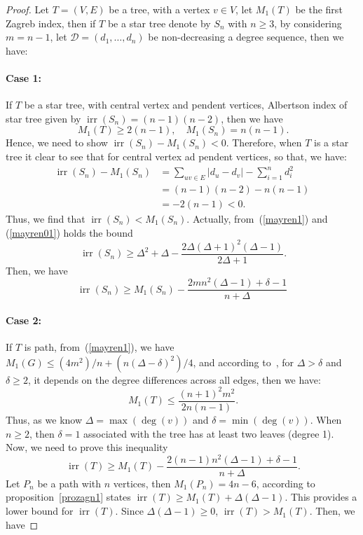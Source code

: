 \documentclass[12pt]{amsart}
\newcommand{\irr}{\operatorname{irr}}
\newcommand{\case}[1]{\paragraph*{Case #1:}}
\begin{document}
\begin{proof}
 Let $T=(V,E)$ be a tree, with a vertex $v\in V$, let $M_1(T)$ be the first Zagreb index, then if $T$ be a star tree denote by $S_n$ with $n\geq 3$, by considering $m=n-1$, let $\mathscr{D}=(d_1,\dots,d_n)$ be non-decreasing a degree sequence, then we have:
 \case{1} If $T$ be a star tree, with central vertex and pendent vertices,  Albertson index of star tree given by $\irr(S_n)=(n-1)(n-2)$, then we have 
 \begin{equation}~\label{mayren1}
  M_1(T)\geq 2(n-1), \quad M_1(S_n)=n(n-1).
 \end{equation}
 Hence, we need to show $\irr(S_n)- M_1(S_n)<0$. Therefore, when $T$ is a star tree it clear to see that for central vertex ad pendent vertices, so that, we have: 
 \begin{align*}
    \irr(S_n)- M_1(S_n)&=\sum_{uv\in E}\lvert d_u-d_v\rvert-\sum_{i=1}^{n}d_i^2\\
    &=(n-1)(n-2)-n(n-1)\\
    &=-2(n-1)<0.
 \end{align*}
Thus, we find that $\irr(S_n)<M_1(S_n)$. Actually, from~(\ref{mayren1}) and (\ref{mayren01}) holds the bound 
\begin{equation}~\label{eqqstarbound01}
    \irr(S_n) \geq \Delta^2 + \Delta - \frac{2 \Delta (\Delta + 1)^2 (\Delta - 1)}{2\Delta + 1}.
\end{equation}
Then, we have
\begin{equation}
    \irr(S_n) \geq M_1(S_n)  - \frac{2mn^2(\Delta - 1)+\delta-1}{n+\Delta}
\end{equation}
\case{2} If $T$ is path, from~(\ref{mayren1}), we have $M_1(G) \leq (4m^2)/n + (n(\Delta - \delta)^2)/4$,  and according to~\cite{Furtula}, for $\Delta> \delta$ and $\delta\geq 2$, it depends on the degree differences across all edges, then we have: 
 \begin{equation}~\label{mayren01}
     M_1(T)\leq \frac{(n+1)^2m^2}{2n(n-1)}.
 \end{equation}
 Thus, as we know $\Delta=\max(\deg(v))$ and $\delta=\min(\deg(v))$. When $n \geq 2$, then $\delta = 1$ associated with the tree has at least two leaves (degree 1). Now, we need to prove this inequality 
 \begin{equation}~\label{mayren2}
\irr(T) \geq M_1(T) - \frac{2(n-1)n^2(\Delta - 1) + \delta - 1}{n + \Delta}. \end{equation}
Let $P_n$ be a path  with $n$ vertices, then $ M_1(P_n) = 4n - 6$, according to proposition~\ref{prozagn1} states $\irr(T) \geq M_1(T) + \Delta(\Delta - 1)$. This provides a lower bound for $\irr(T)$. Since $\Delta(\Delta - 1) \geq 0$, $\irr(T)> M_1(T)$. Then, we have

\end{proof}
\end{document}
